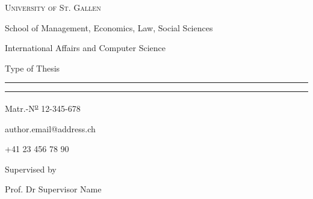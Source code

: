 \begin{titlepage}
    \begin{center}
        \large
        \vspace*{.5\baselineskip}
        
            {\Large\scshape University of St. Gallen}
            
            School of Management, Economics, Law, Social Sciences
    
            International Affairs and Computer Science
            
        \vspace{\fill}
            
            Type of Thesis
            
        \vspace{-.5ex}\vspace{-\fontcharht\font`A}
            
            \rule{\textwidth}{0.5pt}
            
        \vspace{-.25\baselineskip}{\LARGE\scshape\vspace{\fontcharht\font`A}}
    
            {\LARGE\scshape\thetitle}
        
        \vspace{-.25\baselineskip}
            
            \rule{\textwidth}{0.5pt}

        \vspace{-.5ex}
    
            \thedate
    
        \vspace{\fill}
            
            \theauthor
            
            Matr.-N\textsuperscript{\underline{\scriptsize o}} 12-345-678
    
            author.email@address.ch
            
            +41 23 456 78 90
    
        \vspace{\fill}
            
            Supervised by
            
            Prof. Dr Supervisor Name
    
        \vspace{\fill}
    \end{center}
\end{titlepage}